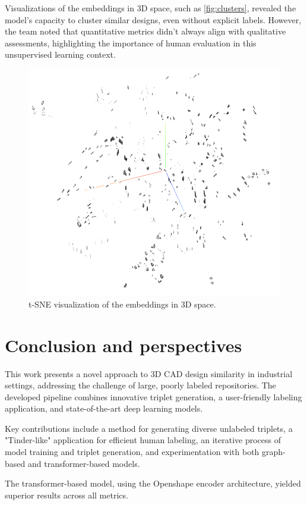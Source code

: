 \documentclass{article}
\begin{document}
Visualizations of the embeddings in 3D space, such as \autoref{fig:clusters}, revealed the model's capacity to cluster similar designs, even without explicit labels. However, the team noted that quantitative metrics didn't always align with qualitative assessments, highlighting the importance of human evaluation in this unsupervised learning context.

\begin{figure}[h]
    \centering
    \includegraphics[width=0.8\columnwidth]{assets/clusters_tsne.png}
    \caption{t-SNE visualization of the embeddings in 3D space.}
    \label{fig:clusters}
\end{figure}

\section{Conclusion and perspectives}

This work presents a novel approach to 3D CAD design similarity in industrial settings, addressing the challenge of large, poorly labeled repositories. The developed pipeline combines innovative triplet generation, a user-friendly labeling application, and state-of-the-art deep learning models. 

Key contributions include a method for generating diverse unlabeled triplets, a "Tinder-like" application for efficient human labeling, an iterative process of model training and triplet generation, and experimentation with both graph-based and transformer-based models.

The transformer-based model, using the Openshape encoder architecture, yielded superior results across all metrics. 
\end{document}
